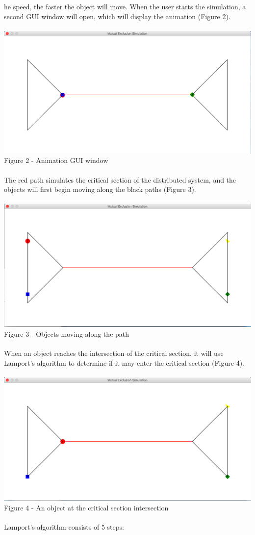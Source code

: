 \documentclass [11pt] {article}
\begin{document}
he speed, the faster the object will move.  When the user starts the simulation, a second GUI window will open, which will display the animation (Figure 2).\\\\  \includegraphics [scale = .5] {Figure2}\\  Figure 2 - Animation GUI window\\\\  The red path simulates the critical section of the distributed system, and the objects will first begin moving along the black paths (Figure 3).\\\\ \includegraphics [scale = .5] {Figure3}\\ Figure 3 - Objects moving along the path\\\\  When an object reaches the intersection of the critical section, it will use Lamport's algorithm to determine if it may enter the critical section (Figure 4).\\\\  \includegraphics [scale = .5] {Figure4}\\ Figure 4 - An object at the critical section intersection\\\\  Lamport's algorithm consists of 5 steps:
\end{document}
